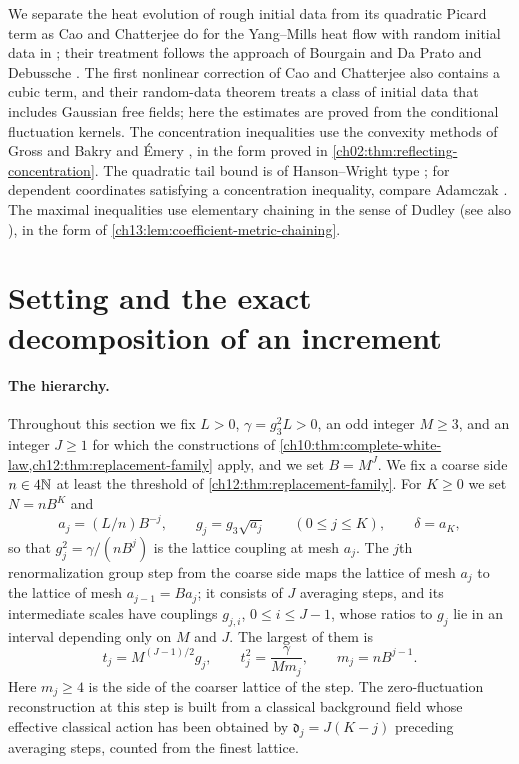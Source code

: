 We separate the heat evolution of rough initial data from its quadratic Picard term as Cao and Chatterjee do for the Yang--Mills heat flow with random initial data in \cite[Definition~2.8 and Theorem~2.10]{CCHeat2022v4}; their treatment follows the approach of Bourgain \cite{Bourgain1996} and Da Prato and Debussche \cite{DaPratoDebussche2003}. The first nonlinear correction of Cao and Chatterjee also contains a cubic term, and their random-data theorem treats a class of initial data that includes Gaussian free fields; here the estimates are proved from the conditional fluctuation kernels. The concentration inequalities use the convexity methods of Gross \cite{Gross1975} and Bakry and \'Emery \cite{BakryEmery1985}, in the form proved in \cref{ch02:thm:reflecting-concentration}. The quadratic tail bound is of Hanson--Wright type \cite{HansonWright1971}; for dependent coordinates satisfying a concentration inequality, compare Adamczak \cite[Theorem~2.5]{Adamczak2015}. The maximal inequalities use elementary chaining in the sense of Dudley \cite{Dudley1967} (see also \cite{Dirksen2015}), in the form of \cref{ch13:lem:coefficient-metric-chaining}.

\section{Setting and the exact decomposition of an increment}\label{ch23:sec:setup}

\paragraph{The hierarchy.}
Throughout this section we fix $L>0$, $\gamma=g_3^2L>0$, an odd integer $M\ge3$, and an integer $J\ge1$ for which the constructions of \cref{ch10:thm:complete-white-law,ch12:thm:replacement-family} apply, and we set $B=M^J$. We fix a coarse side $n\in4\mathbb N$ at least the threshold of \cref{ch12:thm:replacement-family}. For $K\ge0$ we set $N=nB^K$ and
\[
 a_j=(L/n)B^{-j},\qquad g_j=g_3\sqrt{a_j}\qquad(0\le j\le K),\qquad \delta=a_K,
\]
so that $g_j^2=\gamma/(nB^j)$ is the lattice coupling at mesh $a_j$. The $j$th renormalization group step from the coarse side maps the lattice of mesh $a_j$ to the lattice of mesh $a_{j-1}=Ba_j$; it consists of $J$ averaging steps, and its intermediate scales have couplings $g_{j,i}$, $0\le i\le J-1$, whose ratios to $g_j$ lie in an interval depending only on $M$ and $J$. The largest of them is
\[
 t_j=M^{(J-1)/2}g_j,\qquad t_j^2=\frac{\gamma}{Mm_j},\qquad m_j=nB^{j-1}.
\]
Here $m_j\ge4$ is the side of the coarser lattice of the step. The zero-fluctuation reconstruction at this step is built from a classical background field whose effective classical action has been obtained by $\mathfrak d_j=J(K-j)$ preceding averaging steps, counted from the finest lattice.

